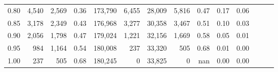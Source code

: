 \begin{tabular}{rrrrrrrrrrrrrr}
0.80 &   4,540 &  2,569 &  0.36 &  173,790 &    6,455 &  28,009 &   5,816 &  0.47 &  0.17 &      0.06 \\
0.85 &   3,178 &  2,349 &  0.43 &  176,968 &    3,277 &  30,358 &   3,467 &  0.51 &  0.10 &      0.03 \\
0.90 &   2,056 &  1,798 &  0.47 &  179,024 &    1,221 &  32,156 &   1,669 &  0.58 &  0.05 &      0.01 \\
0.95 &     984 &  1,164 &  0.54 &  180,008 &      237 &  33,320 &     505 &  0.68 &  0.01 &      0.00 \\
1.00 &     237 &    505 &  0.68 &  180,245 &        0 &  33,825 &       0 &   nan &  0.00 &      0.00 \\
\bottomrule
\end{tabular}
